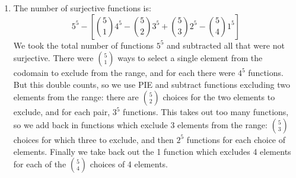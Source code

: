 \documentclass[12pt]{article}
\begin{document}
\begin{example}
\begin{solution}
\begin{enumerate}
    \item The number of surjective functions is:
    \[5^5 - \left[{5 \choose 1}4^5 - {5 \choose 2}3^5 + {5 \choose 3}2^5 - {5 \choose 4}1^5\right]\]
    We took the total number of functions $5^5$ and subtracted all that were not surjective.  There were ${5 \choose 1}$ ways to select a single element from the codomain to exclude from the range, and for each there were $4^5$ functions.  But this double counts, so we use PIE and subtract functions excluding two elements from the range: there are ${5 \choose 2}$ choices for the two elements to exclude, and for each pair, $3^5$ functions.  This takes out too many functions, so we add back in functions which exclude 3 elements from the range: ${5 \choose 3}$ choices for which three to exclude, and then $2^5$ functions for each choice of elements.  Finally we take back out the 1 function which excludes 4 elements for each of the ${5 \choose 4}$ choices of 4 elements.
  \end{enumerate}

\end{solution}

\end{example}
\end{document}
